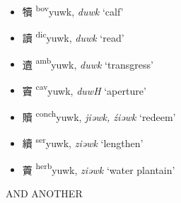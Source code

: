 \begin{itemize}
    \item {\Large{犢}} %
    {\large{{\textsuperscript{bov}}yuwk}},
    \textit{duwk} `calf' %

    \item {\Large{讀}} %
    {\large{{\textsuperscript{dic}}yuwk}},
    \textit{duwk} `read' %


    \item {\Large{䢱}} %
    {\large{{\textsuperscript{amb}}yuwk}},
    \textit{duwk} `transgress' %



    \item {\Large{竇}} %
    {\large{{\textsuperscript{cav}}yuwk}},
    \textit{duwH} `aperture' %

    \item {\Large{贖}} %
    {\large{{\textsuperscript{conch}}yuwk}},
    \textit{jiəwk, źiəwk} `redeem' %

    \item {\Large{續}} %
    {\large{{\textsuperscript{ser}}yuwk}},
    \textit{ziəwk} `lengthen' %

    \item {\Large{藚}} %
    {\large{{\textsuperscript{herb}}yuwk}},
    \textit{ziəwk} `water plantain' %
\end{itemize}


AND ANOTHER 

